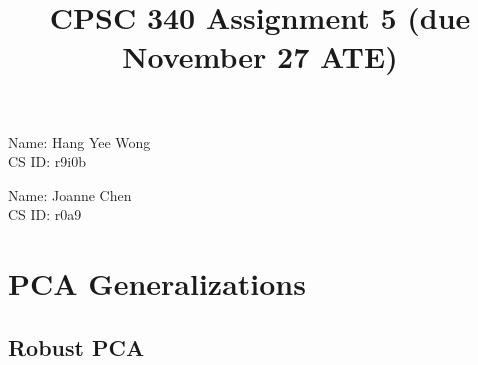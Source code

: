 \documentclass{article}
\begin{document}
\title{CPSC 340 Assignment 5 (due November 27 ATE)}
\author{}
\date{}
\maketitle
\vspace{-4em}

Name: Hang Yee Wong\\
CS ID: r9i0b

Name: Joanne Chen\\
CS ID: r0a9

\section{PCA Generalizations}


\subsection{Robust PCA}
\end{document}
